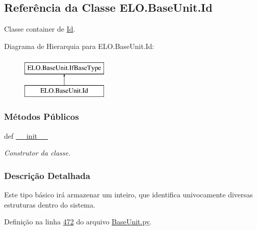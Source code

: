\hypertarget{classELO_1_1BaseUnit_1_1Id}{\subsection{Referência da Classe E\-L\-O.\-Base\-Unit.\-Id}
\label{classELO_1_1BaseUnit_1_1Id}
}


Classe container de \hyperlink{classELO_1_1BaseUnit_1_1Id}{Id}.  


Diagrama de Hierarquia para E\-L\-O.\-Base\-Unit.\-Id\-:\begin{figure}[H]
\begin{center}
\leavevmode
\includegraphics[height=2.000000cm]{d7/dca/classELO_1_1BaseUnit_1_1Id}
\end{center}
\end{figure}
\subsubsection*{Métodos Públicos}
\begin{DoxyCompactItemize}
\item 
def \hyperlink{classELO_1_1BaseUnit_1_1Id_adc3e24ef020fb79dda540cdbec85b7a8}{\-\_\-\-\_\-init\-\_\-\-\_\-}
\begin{DoxyCompactList}\small\item\em Construtor da classe. \end{DoxyCompactList}\end{DoxyCompactItemize}


\subsubsection{Descrição Detalhada}
Este tipo básico irá armazenar um inteiro, que identifica univocamente diversas estruturas dentro do sistema. 

Definição na linha \hyperlink{BaseUnit_8py_source_l00472}{472} do arquivo \hyperlink{BaseUnit_8py_source}{Base\-Unit.\-py}.



